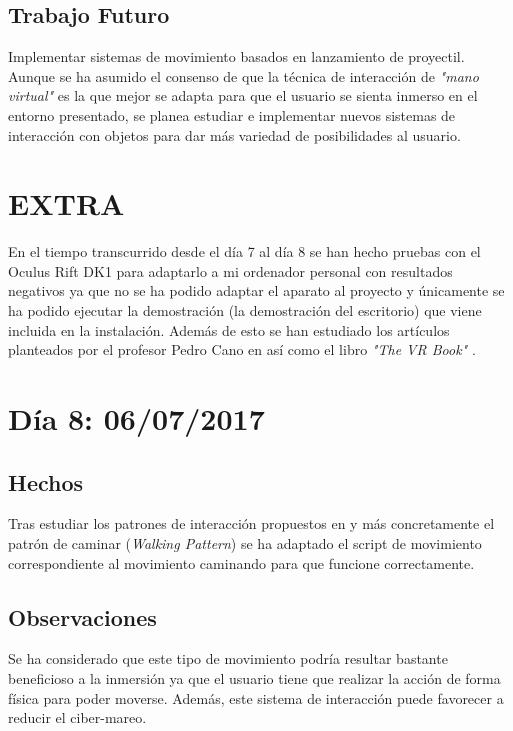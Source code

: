 \documentclass[12pt,a4paper]{article}
\begin{document}
\subsection{Trabajo Futuro}

Implementar sistemas de movimiento basados en lanzamiento de proyectil.
Aunque se ha asumido el consenso de que la técnica de interacción de \textit{"mano virtual"} es la que mejor se adapta para que el usuario se sienta inmerso en el entorno presentado, se planea estudiar e implementar nuevos sistemas de interacción con objetos para dar más variedad de posibilidades al usuario.

\section{EXTRA}

En el tiempo transcurrido desde el día 7 al día 8 se han hecho pruebas con el Oculus Rift DK1 para adaptarlo a mi ordenador personal con resultados negativos ya que no se ha podido adaptar el aparato al proyecto y únicamente se ha podido ejecutar la demostración (la demostración del escritorio) que viene incluida en la instalación.
Además de esto se han estudiado los artículos planteados por el profesor Pedro Cano en \cite{Google Docs} así como el libro \textit{"The VR Book"}  \cite{Jerald 2016}.


\section{Día 8: 06/07/2017}

\subsection{Hechos}

Tras estudiar los patrones de interacción propuestos en \cite{Jerald 2016} y más concretamente el patrón de caminar (\textit{Walking Pattern}) \cite[28.3.1, pp. 336-338]{Jerald 2016} se ha adaptado el script de movimiento correspondiente al movimiento caminando para que funcione correctamente.

\subsection{Observaciones}

Se ha considerado que este tipo de movimiento podría resultar bastante beneficioso a la inmersión ya que el usuario tiene que realizar la acción de forma física para poder moverse. Además, este sistema de interacción puede favorecer a reducir el ciber-mareo.
\end{document}
